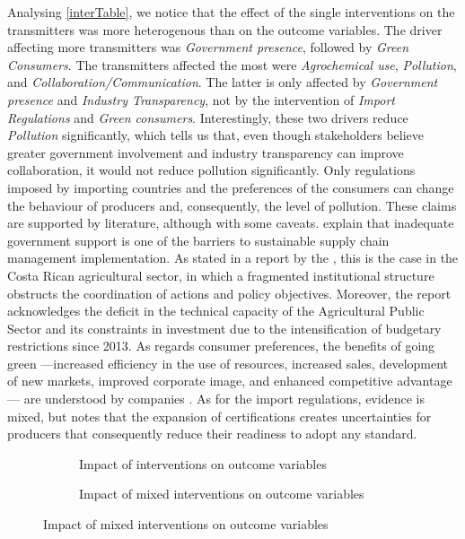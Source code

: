 Analysing \cref{interTable}, we notice that the effect of the single interventions on the transmitters was more heterogenous than on the outcome variables. The driver affecting more transmitters was \textit{Government presence}, followed by \textit{Green Consumers}. The transmitters affected the most were \textit{Agrochemical use}, \textit{Pollution}, and \textit{Collaboration/Communication}. The latter is only affected by \textit{Government presence} and \textit{Industry Transparency}, not by the intervention of \textit{Import Regulations} and \textit{Green consumers}. Interestingly, these two drivers reduce \textit{Pollution} significantly, which tells us that, even though stakeholders believe greater government involvement and industry transparency can improve collaboration, it would not reduce pollution significantly. Only regulations imposed by importing countries and the preferences of the consumers can change the behaviour of producers and, consequently, the level of pollution. These claims are supported by literature, although with some caveats. \cite{sajjad2015sustainable} explain that inadequate government support is one of the barriers to sustainable supply chain management implementation. As stated in a report by the \cite{oecd2017oecd}, this is the case in the Costa Rican agricultural sector, in which a fragmented 
institutional structure obstructs the coordination of actions and policy objectives. Moreover, the report acknowledges the  deficit in the technical capacity of the Agricultural Public Sector and its constraints in investment due to the intensification of budgetary restrictions since 2013. As regards consumer preferences, the benefits of going green ---increased efficiency in the use of resources, increased sales, development of new markets, improved corporate image, and enhanced competitive advantage--- are understood by companies \citep{dangelico2010mainstreaming}. As for the import regulations, evidence is mixed, but \cite{montiel2019effect} notes that the expansion of certifications creates uncertainties for producers that consequently reduce their readiness to adopt any standard.

\begin{figure}[h]
\caption{Impact of (mixed) interventions on outcome variables} \label{interBars}
\begin{subfigure}[b]{0.45\textwidth}
  \centering
  
\caption{Impact of interventions on outcome variables} 
  \label{interventionBar}
\end{subfigure}%
  \hfill
\begin{subfigure}[b]{0.45\textwidth}
  \centering
  
\caption{Impact of mixed interventions on outcome variables}    
  \label{mixedBar}
\end{subfigure}
\end{figure}

